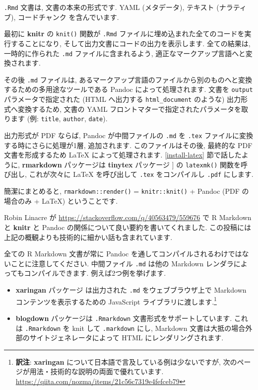\documentclass[
  11pt,
]{bxjsreport}
\begin{document}
\texttt{.Rmd} 文書は, 文書の本来の形式です. YAML (メタデータ), テキスト (ナラティブ), コードチャンク を含んでいます.

最初に \textbf{knitr} \autocite{R-knitr} の \texttt{knit()} 関数が \texttt{.Rmd} ファイルに埋め込まれた全てのコードを実行することになり, そして出力文書にコードの出力を表示します. 全ての結果は, 一時的に作られた \texttt{.md} ファイルに含まれるよう, 適正なマークアップ言語へと変換されます.

その後 \texttt{.md} ファイルは, あるマークアップ言語のファイルから別のものへと変換するための多用途なツールである Pandoc によって処理されます. 文書を \texttt{output} パラメータで指定された (HTML へ出力する \texttt{html\_document} のような) 出力形式へ変換するため, 文書の YAML フロントマターで指定されたパラメータを取ります (例: \texttt{title}, \texttt{author}, \texttt{date}).

出力形式が PDF ならば, Pandoc が中間ファイルの \texttt{.md} を \texttt{.tex} ファイルに変換する時にさらに処理が1層, 追加されます. このファイルはその後, 最終的な PDF 文書を形成するため LaTeX によって処理されます. \ref{install-latex} 節で話したように, \textbf{rmarkdown} パッケージは \textbf{tinytex} パッケージ \textcite{R-tinytex}{]} の \texttt{latexmk()} 関数を呼び出し, これが次々に LaTeX を呼び出して \texttt{.tex} をコンパイルし \texttt{.pdf} にします.

簡潔にまとめると, \texttt{rmarkdown::render()} = \texttt{knitr::knit()} + Pandoc (PDF の場合のみ + LaTeX) ということです.

Robin Linacre が \url{https://stackoverflow.com/q/40563479/559676} で R Markdown と \textbf{knitr} と Pandoc の関係について良い要約を書いてくれました. この投稿には上記の概観よりも技術的に細かい話も含まれています.

全ての R Markdown 文書が常に Pandoc を通してコンパイルされるわけではないことに注意してください. 中間ファイル \texttt{.md} は他の Markdown レンダラによってもコンパイルできます. 例えば2つ例を挙げます.

\begin{itemize}
\item
  \textbf{xaringan} パッケージ \autocite{R-xaringan} は出力された \texttt{.md} をウェブブラウザ上で Markdown コンテンツを表示するための JavaScript ライブラリに渡します.\footnote{\textbf{訳注}: \textbf{xaringan} について日本語で言及している例は少ないですが, 次のページが用法・技術的な説明の両面で優れています. \url{https://qiita.com/nozma/items/21c56c7319e4fefceb79}}
\item
  \textbf{blogdown} パッケージは \autocite{R-blogdown} \texttt{.Rmarkdown} 文書形式をサポートしています. これは \texttt{.Rmarkdown} を knit して \texttt{.markdown} にし, Markdown 文書は大抵の場合外部のサイトジェネレータによって HTML にレンダリングされます.
\end{itemize}
\end{document}
